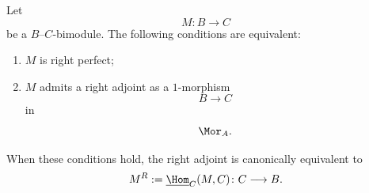 \begin{proposition}
\label{prop:right-perfect-morita-adjointability}
Let
\[
    M
    \colon
    B
    \longrightarrow
    C
\]
be a $B$--$C$-bimodule. The following conditions are equivalent:
\begin{enumerate}[label=(\roman*)]
    \item $M$ is right perfect;

    \item $M$ admits a right adjoint as a $1$-morphism
    \[
        B
        \longrightarrow
        C
    \]
    in
    \[
        \Mor_A.
    \]
\end{enumerate}

When these conditions hold, the right adjoint is canonically equivalent
to
\[
    M^R
    :=
    \underline{\Hom}_C(M,C)
    \colon
    C
    \longrightarrow
    B.
\]
\end{proposition}
